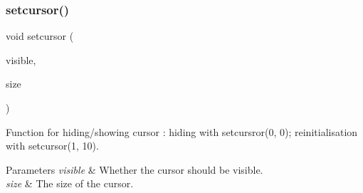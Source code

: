 \subsubsection{setcursor()}
{\footnotesize\ttfamily void setcursor (\begin{DoxyParamCaption}\item[{bool}]{visible,  }\item[{D\+W\+O\+RD}]{size }\end{DoxyParamCaption})}

Function for hiding/showing cursor \+: hiding with setcursror(0, 0); reinitialisation with setcursor(1, 10).


\begin{DoxyParams}{Parameters}
{\em visible} & Whether the cursor should be visible. \\
\hline
{\em size} & The size of the cursor. \\
\hline
\end{DoxyParams}
